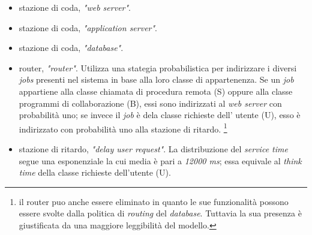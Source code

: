 \documentclass[../main.tex]{subfiles}
\begin{document}
    \begin{itemize}
        \item stazione di coda, \textit{"web server"}.
        \item stazione di coda, \textit{"application server"}.
        \item stazione di coda, \textit{"database"}.
        \item router, \textit{"router"}. Utilizza una stategia probabilistica per indirizzare i diversi \textit{jobs} presenti nel sistema in base alla loro classe di appartenenza.
        Se un \textit{job} appartiene alla classe chiamata di procedura remota (S) oppure alla classe programmi di collaborazione (B), essi sono indirizzati al \textit{web server} con probabilità uno;
        se invece il \textit{job} è dela classe richieste dell' utente (U), esso è indirizzato con probabilità uno alla stazione di ritardo. \footnote{il router puo anche essere eliminato in quanto le sue funzionalità possono essere svolte dalla politica di \textit{routing} del \textit{database}. Tuttavia la sua presenza è giustificata da una maggiore leggibilità del modello.}
        \item stazione di ritardo, \textit{"delay user request"}. La distribuzione del \textit{service time} segue una esponenziale la cui media è pari a \textit{12000 ms};
        essa equivale al \textit{think time} della classe richieste dell'utente (U).

    \end{itemize}
\end{document}
